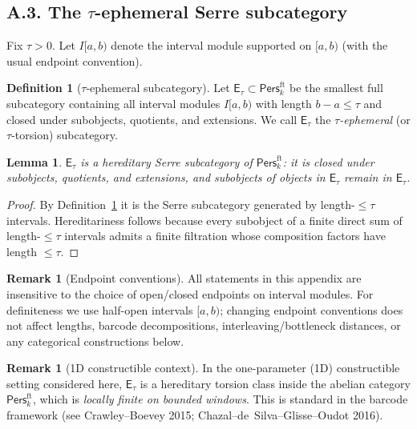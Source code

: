 \documentclass[11pt]{article}
\newcommand{\Pers}{\mathsf{Pers}}
\numberwithin{equation}{section}
\newtheorem{lemma}[theorem]{Lemma}
\theoremstyle{definition}
\newtheorem{definition}[theorem]{Definition}
\newtheorem{remark}[theorem]{Remark}
\begin{document}
\subsection*{A.3. The \texorpdfstring{$\tau$}{tau}-ephemeral Serre subcategory}
Fix \(\tau>0\).
Let \(I[a,b)\) denote the interval module supported on \([a,b)\) (with the usual endpoint convention).

\begin{definition}[\(\tau\)-ephemeral subcategory]\label{A:def:Etau}
Let \(\mathsf{E}_\tau\subset\Pers^{\mathrm{ft}}_k\) be the smallest full subcategory
containing all interval modules \(I[a,b)\) with length \(b-a\le \tau\) and closed under subobjects, quotients, and extensions.
We call \(\mathsf{E}_\tau\) the \emph{\(\tau\)-ephemeral} (or \(\tau\)-torsion) subcategory.
\end{definition}

\begin{lemma}\label{A:lem:Serre}
\(\mathsf{E}_\tau\) is a hereditary Serre subcategory of \(\Pers^{\mathrm{ft}}_k\):
it is closed under subobjects, quotients, and extensions, and subobjects of objects in \(\mathsf{E}_\tau\) remain in \(\mathsf{E}_\tau\).
\end{lemma}

\begin{proof}
By Definition~\ref{A:def:Etau} it is the Serre subcategory generated by length-\(\le\tau\) intervals.
Hereditariness follows because every subobject of a finite direct sum of length-\(\le\tau\) intervals admits a finite filtration whose composition factors have length \(\le\tau\).
\end{proof}

\begin{remark}[Endpoint conventions]\label{A:rk:endpoints}
All statements in this appendix are insensitive to the choice of open/closed endpoints on interval modules.
For definiteness we use half-open intervals \([a,b)\); changing endpoint conventions does not affect lengths, barcode decompositions, interleaving/bottleneck distances, or any categorical constructions below.
\end{remark}

\begin{remark}[1D constructible context]
In the one-parameter (1D) constructible setting considered here, \(\mathsf{E}_\tau\) is a hereditary torsion class inside the abelian category \(\Pers^{\mathrm{ft}}_k\), which is \emph{locally finite on bounded windows}.
This is standard in the barcode framework (see Crawley–Boevey 2015; Chazal–de~Silva–Glisse–Oudot 2016).
\end{remark}
\end{document}
